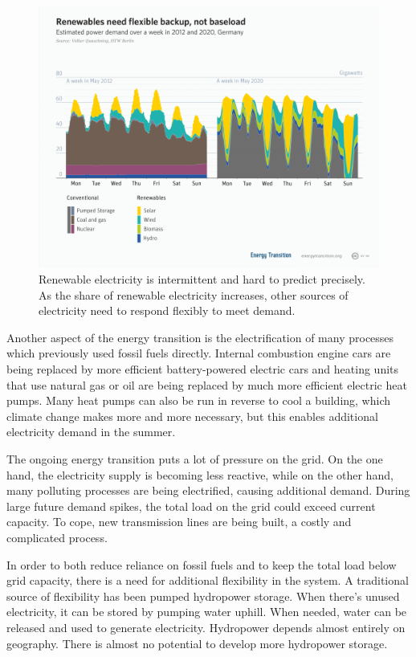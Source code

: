\begin{figure}
    \centering
    \includegraphics[width = \figurewidth]{figures/flexible_renewables.png}
    \caption{Renewable electricity is intermittent and hard to predict precisely. As the share of renewable electricity increases, other sources of electricity need to respond flexibly to meet demand.}
    \label{fig:flexibility}
\end{figure}


Another aspect of the energy transition is the electrification of many processes which previously used fossil fuels directly.
Internal combustion engine cars are being replaced by more efficient battery-powered electric cars and heating units that use natural gas or oil are being replaced by much more efficient electric heat pumps.
Many heat pumps can also be run in reverse to cool a building, which climate change makes more and more necessary, but this enables additional electricity demand in the summer.

The ongoing energy transition puts a lot of pressure on the grid.
On the one hand, the electricity supply is becoming less reactive, while on the other hand, many polluting processes are being electrified, causing additional demand.
During large future demand spikes, the total load on the grid could exceed current capacity. To cope, new transmission lines are being built, a costly and complicated process.

In order to both reduce reliance on fossil fuels and to keep the total load below grid capacity, there is a need for additional flexibility in the system.
A traditional source of flexibility has been pumped hydropower storage.
When there's unused electricity, it can be stored by pumping water uphill.
When needed, water can be released and used to generate electricity. 
Hydropower depends almost entirely on geography. There is almost no potential to develop more hydropower storage.

